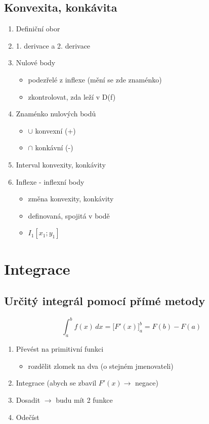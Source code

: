 \documentclass{article}
\begin{document}
\subsection{Konvexita, konkávita}
\begin{enumerate}
  \item Definiční obor
  \item 1. derivace a 2. derivace
  \item Nulové body
    \begin{itemize}
      \item podezřelé z inflexe (mění se zde znaménko)
      \item zkontrolovat, zda leží v D(f)
    \end{itemize}
  \item Znaménko nulových bodů
    \begin{itemize}
      \item $\cup$ konvexní (+)
      \item $\cap$ konkávní (-)
    \end{itemize}
  \item Interval konvexity, konkávity
  \item Inflexe - inflexní body
    \begin{itemize}
      \item změna konvexity, konkávity
      \item definovaná, spojitá v bodě
      \item $I_1[x_1;y_1]$
    \end{itemize}
\end{enumerate}

\clearpage
\section{Integrace}
\subsection{Určitý integrál pomocí přímé metody}
\begin{equation}
\int_{a}^{b}f(x)\,dx = \Bigr[ F'(x) \Bigr]_a^b=F(b)-F(a)
\end{equation}

\begin{enumerate}
  \item Převést na primitivní funkci
    \begin{itemize}
      \item rozdělit zlomek na dva (o stejném jmenovateli)
    \end{itemize}
  \item Integrace (abych se zbavil $F'(x)\rightarrow$ negace)
  \item Dosadit $\rightarrow$ budu mít 2 funkce
  \item Odečíst
\end{enumerate}
\end{document}
